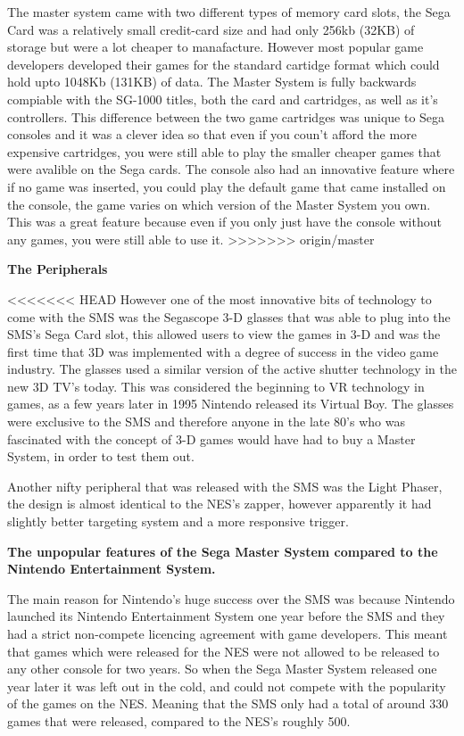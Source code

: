\documentclass{scrartcl}
\begin{document}
The master system came with two different types of memory card slots, the Sega Card was a relatively small credit-card size and had only 256kb (32KB) of storage but were a lot cheaper to manafacture. However most popular game developers developed their games for the standard cartidge format which could hold upto 1048Kb (131KB) of data. \cite{Weiss2009} The Master System is fully backwards compiable with the SG-1000 titles, both the card and cartridges, as well as it's controllers. \cite{racket} This difference between the two game cartridges was unique to Sega consoles and it was a clever idea so that even if you coun't afford the more expensive cartridges, you were still able to play the smaller cheaper games that were avalible on the Sega cards. The console also had an innovative feature where if no game was inserted, you could play the default game that came installed on the console, the game varies on which version of the Master System you own. This was a great feature because even if you only just have the console without any games, you were still able to use it.
>>>>>>> origin/master



\textbf{The Peripherals} \par

<<<<<<< HEAD
However one of the most innovative bits of technology to come with the SMS was the Segascope 3-D glasses that was able to plug into the SMS's Sega Card slot, this allowed users to view the games in 3-D and was the first time that 3D was implemented with a degree of success in the video game industry. The glasses used a similar version of the active shutter technology in the new 3D TV's today.\cite{SegaScopeTech} This was considered the beginning to VR technology in games, as a few years later in 1995 Nintendo released its Virtual Boy. \cite{Workman} The glasses were exclusive to the SMS and therefore anyone in the late 80's who was fascinated with the concept of 3-D games would have had to buy a Master System, in order to test them out.

Another nifty peripheral that was released with the SMS was the Light Phaser, the design is almost identical to the NES's zapper, however apparently it had slightly better targeting system and a more responsive trigger. 


\textbf{The unpopular features of the Sega Master System compared to the Nintendo Entertainment System.} \par

The main reason for Nintendo’s huge success over the SMS was because Nintendo launched its Nintendo Entertainment System one year before the SMS and they had a strict non-compete licencing agreement with game developers. This meant that games which were released for the NES were not allowed to be released to any other console for two years.\cite{Weiss2009} So when the Sega Master System released one year later it was left out in the cold, and could not compete with the popularity of the games on the NES. Meaning that the SMS only had a total of around 330 games that were released, compared to the NES's roughly 500. \cite{russell}
\end{document}

